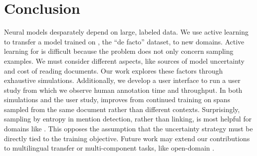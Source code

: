 \section{Conclusion}

Neural \coref{} models desparately depend on large, labeled data.
 We use active learning to transfer a model trained on \ontonotes{}, the
 ``de facto'' dataset, to new domains.
Active learning for \coref{} is difficult because the problem does not only
concern sampling examples. We must consider different aspects, like sources of
model uncertainty and cost of reading documents.
Our work explores these factors through exhaustive simulations.
Additionally, we develop a user interface to run a user study from which we observe human annotation time and
throughput.
In both simulations and the user study, \coref{} improves from
continued training on spans sampled from the same document rather than different
contexts.
Surprisingly, sampling by entropy in mention detection, rather than linking, is most helpful for domains like
\preco{}. This opposes the assumption that the uncertainty strategy must
be directly tied to the training objective.
Future work may extend our contributions to multilingual transfer or
multi-component tasks, like open-domain .
